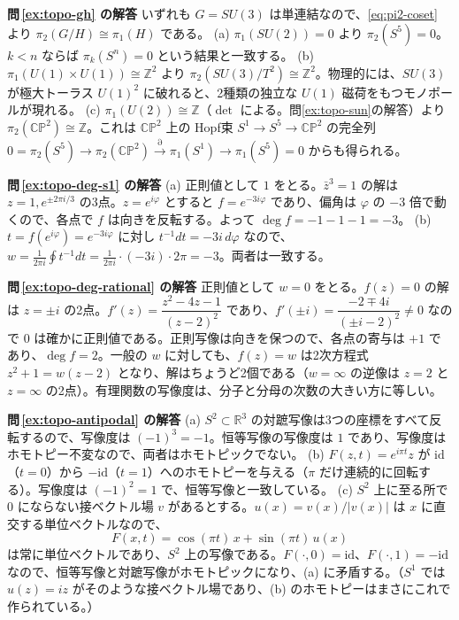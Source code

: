 \documentclass[uplatex, dvipdfmx, book]{jsbook}
\newcommand{\exsol}[1]{\par\medskip\noindent\textbf{問\,\ref{#1} の解答}\quad}
\begin{document}
\exsol{ex:topo-gh}
いずれも $G = SU(3)$ は単連結なので、\eqref{eq:pi2-coset} より $\pi_2(G/H) \cong \pi_1(H)$ である。
(a) $\pi_1(SU(2)) = 0$ より $\pi_2(S^5) = 0$。$k < n$ ならば $\pi_k(S^n) = 0$ という結果と一致する。
(b) $\pi_1(U(1) \times U(1)) \cong \mathbb{Z}^2$ より $\pi_2(SU(3)/T^2) \cong \mathbb{Z}^2$。物理的には、$SU(3)$ が極大トーラス $U(1)^2$ に破れると、2種類の独立な $U(1)$ 磁荷をもつモノポールが現れる。
(c) $\pi_1(U(2)) \cong \mathbb{Z}$（$\det$ による。問\ref{ex:topo-sun}の解答）より $\pi_2(\mathbb{CP}^2) \cong \mathbb{Z}$。これは $\mathbb{CP}^2$ 上の Hopf束 $S^1 \to S^5 \to \mathbb{CP}^2$ の完全列 $0 = \pi_2(S^5) \to \pi_2(\mathbb{CP}^2) \xrightarrow{\partial} \pi_1(S^1) \to \pi_1(S^5) = 0$ からも得られる。

\exsol{ex:topo-deg-s1}
(a) 正則値として $1$ をとる。$\bar{z}^3 = 1$ の解は $z = 1, e^{\pm 2\pi i/3}$ の3点。$z = e^{i\varphi}$ とすると $f = e^{-3i\varphi}$ であり、偏角は $\varphi$ の $-3$ 倍で動くので、各点で $f$ は向きを反転する。よって $\deg f = -1 - 1 - 1 = -3$。
(b) $t = f(e^{i\varphi}) = e^{-3i\varphi}$ に対し $t^{-1}dt = -3i\,d\varphi$ なので、$w = \frac{1}{2\pi i}\oint t^{-1}dt = \frac{1}{2\pi i}\cdot(-3i)\cdot 2\pi = -3$。両者は一致する。

\exsol{ex:topo-deg-rational}
正則値として $w = 0$ をとる。$f(z) = 0$ の解は $z = \pm i$ の2点。$f'(z) = \dfrac{z^2 - 4z - 1}{(z - 2)^2}$ であり、$f'(\pm i) = \dfrac{-2 \mp 4i}{(\pm i - 2)^2} \neq 0$ なので $0$ は確かに正則値である。正則写像は向きを保つので、各点の寄与は $+1$ であり、$\deg f = 2$。一般の $w$ に対しても、$f(z) = w$ は2次方程式 $z^2 + 1 = w(z - 2)$ となり、解はちょうど2個である（$w = \infty$ の逆像は $z = 2$ と $z = \infty$ の2点）。有理関数の写像度は、分子と分母の次数の大きい方に等しい。

\exsol{ex:topo-antipodal}
(a) $S^2 \subset \mathbb{R}^3$ の対蹠写像は3つの座標をすべて反転するので、写像度は $(-1)^3 = -1$。恒等写像の写像度は $1$ であり、写像度はホモトピー不変なので、両者はホモトピックでない。
(b) $F(z, t) = e^{i\pi t} z$ が $\mathrm{id}$（$t = 0$）から $-\mathrm{id}$（$t = 1$）へのホモトピーを与える（$\pi$ だけ連続的に回転する）。写像度は $(-1)^2 = 1$ で、恒等写像と一致している。
(c) $S^2$ 上に至る所で $0$ にならない接ベクトル場 $v$ があるとする。$u(x) = v(x)/|v(x)|$ は $x$ に直交する単位ベクトルなので、
\begin{equation*}
    F(x, t) = \cos(\pi t)\, x + \sin(\pi t)\, u(x)
\end{equation*}
は常に単位ベクトルであり、$S^2$ 上の写像である。$F(\cdot, 0) = \mathrm{id}$、$F(\cdot, 1) = -\mathrm{id}$ なので、恒等写像と対蹠写像がホモトピックになり、(a) に矛盾する。（$S^1$ では $u(z) = iz$ がそのような接ベクトル場であり、(b) のホモトピーはまさにこれで作られている。）
\end{document}
